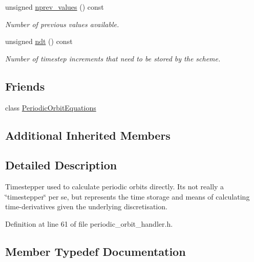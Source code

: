 \begin{DoxyCompactItemize}
unsigned \hyperlink{classoomph_1_1PeriodicOrbitTimeDiscretisation_aff80f0af851d19d3b19cfee5d17022f3}{nprev\+\_\+values} () const
\begin{DoxyCompactList}\small\item\em Number of previous values available. \end{DoxyCompactList}\item 
unsigned \hyperlink{classoomph_1_1PeriodicOrbitTimeDiscretisation_ac26b0ab91fc9ec95dad7c207d960216a}{ndt} () const
\begin{DoxyCompactList}\small\item\em Number of timestep increments that need to be stored by the scheme. \end{DoxyCompactList}\end{DoxyCompactItemize}
\subsection*{Friends}
\begin{DoxyCompactItemize}
\item 
class \hyperlink{classoomph_1_1PeriodicOrbitTimeDiscretisation_a3652005e173ad0e9d796ff415406c9c4}{Periodic\+Orbit\+Equations}
\end{DoxyCompactItemize}
\subsection*{Additional Inherited Members}


\subsection{Detailed Description}
Timestepper used to calculate periodic orbits directly. It\textquotesingle{}s not really a \char`\"{}timestepper\char`\"{} per se, but represents the time storage and means of calculating time-\/derivatives given the underlying discretisation. 

Definition at line 61 of file periodic\+\_\+orbit\+\_\+handler.\+h.



\subsection{Member Typedef Documentation}
\mbox{\label{classoomph_1_1PeriodicOrbitTimeDiscretisation_a0bccd8d239689d95cf7422d877a5eed8}} 
